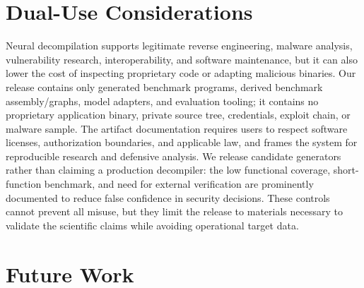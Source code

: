 \documentclass[11pt]{article}
\begin{document}
\section{Dual-Use Considerations}

Neural decompilation supports legitimate reverse engineering, malware analysis, vulnerability research, interoperability, and software maintenance, but it can also lower the cost of inspecting proprietary code or adapting malicious binaries. Our release contains only generated benchmark programs, derived benchmark assembly/graphs, model adapters, and evaluation tooling; it contains no proprietary application binary, private source tree, credentials, exploit chain, or malware sample. The artifact documentation requires users to respect software licenses, authorization boundaries, and applicable law, and frames the system for reproducible research and defensive analysis. We release candidate generators rather than claiming a production decompiler: the low functional coverage, short-function benchmark, and need for external verification are prominently documented to reduce false confidence in security decisions. These controls cannot prevent all misuse, but they limit the release to materials necessary to validate the scientific claims while avoiding operational target data.

\section{Future Work}
\end{document}
